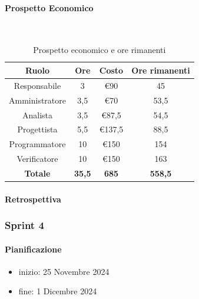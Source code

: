 \documentclass{article}
\begin{document}
                \paragraph{Prospetto Economico}\mbox{}\\
                \begin{table}[H]
                    \centering
                    \begin{tabular}{|c|c|c|c|}
                    \hline
                    \textbf{Ruolo}  & \textbf{Ore}  & \textbf{Costo} & \textbf{Ore rimanenti} \\ \hline
                    Responsabile    & 3             & €90            & 45                     \\ \hline
                    Amministratore  & 3,5           & €70            & 53,5                   \\ \hline
                    Analista        & 3,5           & €87,5          & 54,5                   \\ \hline
                    Progettista     & 5,5           & €137,5         & 88,5                   \\ \hline
                    Programmatore   & 10            & €150           & 154                    \\ \hline
                    Verificatore    & 10            & €150           & 163                    \\ \hline
                    \textbf{Totale} & \textbf{35,5} & \textbf{685}   & \textbf{558,5}         \\ \hline
                    \end{tabular}
                    \caption{Prospetto economico e ore rimanenti}
                \end{table}

                \paragraph{Retrospettiva}
            \subsubsection{Sprint 4}
                \paragraph{Pianificazione}
                \begin{itemize}
                    \item inizio: 25 Novembre 2024
                    \item fine: 1 Dicembre 2024
                \end{itemize}
\end{document}
